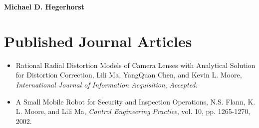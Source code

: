 %
%
%
%

\begin{vita}

\begin{center}
{\Large \bf Michael D. Hegerhorst}\\
\end{center}

\section*{Published Journal Articles}
    \begin{itemize}
    \item Rational Radial Distortion Models of Camera Lenses with Analytical Solution for Distortion Correction, Lili
    Ma, YangQuan Chen, and Kevin L. Moore, {\it International Journal of Information Acquisition}, {\it Accepted}.

    \item A Small Mobile Robot for Security and Inspection Operations, N.S. Flann, K. L. Moore, and Lili Ma, {\it Control Engineering Practice}, vol. 10, pp. 1265-1270,
    2002.
    \end{itemize}


\end{vita}
